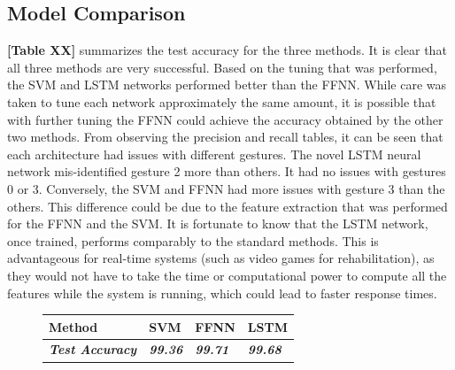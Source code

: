 \documentclass{article}
\begin{document}
\subsection*{Model Comparison}
\textbf{[Table XX]} summarizes the test accuracy for the three methods. It is clear that all three methods are very successful. Based on the tuning that was performed, the SVM and LSTM networks performed better than the FFNN. While care was taken to tune each network approximately the same amount, it is possible that with further tuning the FFNN could achieve the accuracy obtained by the other two methods. From observing the precision and recall tables, it can be seen that each architecture had issues with different gestures. The novel LSTM neural network mis-identified gesture 2 more than others. It had no issues with gestures 0 or 3. Conversely, the SVM and FFNN had more issues with gesture 3 than the others. This difference could be due to the feature extraction that was performed for the FFNN and the SVM. It is fortunate to know that the LSTM network, once trained, performs comparably to the standard methods. This is advantageous for real-time systems (such as video games for rehabilitation), as they would not have to take the time or computational power to compute all the features while the system is running, which could lead to faster response times.

\begin{figure}[!htb]
\caption{Final Model Comparison}
\begin{table}[H]
\centering
\begin{tabular}{|l|l|l|l|}
\hline
Method                          & SVM                     & FFNN                    & LSTM                    \\ \hline
\textit{\textbf{Test Accuracy}} & \textit{\textbf{99.36}} & \textit{\textbf{99.71}} & \textit{\textbf{99.68}} \\ \hline
\end{tabular}
\end{table}
\end{figure}
\end{document}
